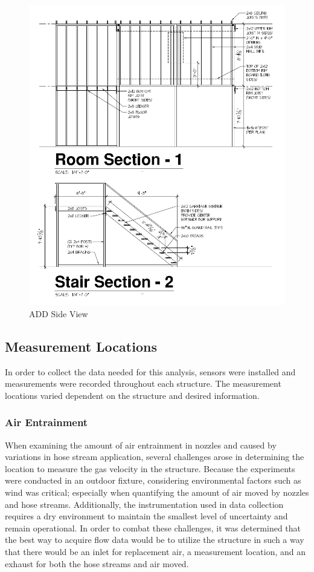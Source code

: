 \documentclass{article}
\begin{document}
\begin{figure}[!ht]
	\centering
	\includegraphics[width=5.5in]{Figures/Water_Distribution/ADDsideviewprint.png}
	\caption{ADD Side View}
	\label{fig:ADD_Side_View}
\end{figure}

\clearpage

\subsection{Measurement Locations}

In order to collect the data needed for this analysis, sensors were installed and measurements were recorded throughout each structure. The measurement locations varied dependent on the structure and desired information.

\subsubsection{Air Entrainment}

When examining the amount of air entrainment in nozzles and caused by variations in hose stream application, several challenges arose in determining the location to measure the gas velocity in the structure. Because the experiments were conducted in an outdoor fixture, considering environmental factors such as wind was critical; especially when quantifying the amount of air moved by nozzles and hose streams. Additionally, the instrumentation used in data collection requires a dry environment to maintain the smallest level of uncertainty and remain operational. In order to combat these challenges, it was determined that the best way to acquire flow data would be to utilize the structure in such a way that there would be an inlet for replacement air, a measurement location, and an exhaust for both the hose streams and air moved. 
\end{document}
